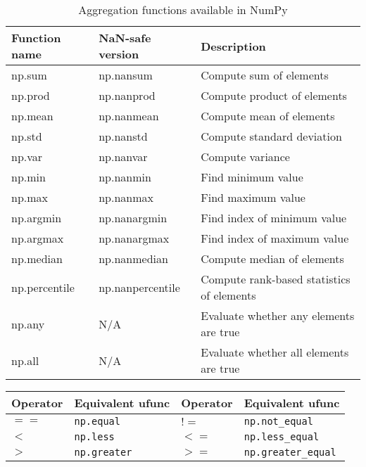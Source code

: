\begin{table}
    \centering
    \caption{Aggregation functions available in NumPy}
    \label{Aggregation functions available in NumPy}
    \begin{tabular}{lll}
        \hline
        Function name & NaN-safe version & Description                               \\
        \hline
        np.sum        & np.nansum        & Compute sum of elements                   \\
        np.prod       & np.nanprod       & Compute product of elements               \\
        np.mean       & np.nanmean       & Compute mean of elements                  \\
        np.std        & np.nanstd        & Compute standard deviation                \\
        np.var        & np.nanvar        & Compute variance                          \\
        np.min        & np.nanmin        & Find minimum value                        \\
        np.max        & np.nanmax        & Find maximum value                        \\
        np.argmin     & np.nanargmin     & Find index of minimum value               \\
        np.argmax     & np.nanargmax     & Find index of maximum value               \\
        np.median     & np.nanmedian     & Compute median of elements                \\
        np.percentile & np.nanpercentile & Compute rank-based statistics of elements \\
        np.any        & N/A              & Evaluate whether any elements are true    \\
        np.all        & N/A              & Evaluate whether all elements are true    \\
        \hline
    \end{tabular}
\end{table}

\begin{table}[H]
    \centering
    \begin{tabular}{llll}
        \hline
        Operator & Equivalent ufunc  & Operator & Equivalent ufunc        \\
        \hline
        $==$     & \verb|np.equal|   & $!=$     & \verb|np.not_equal|     \\
        $<$      & \verb|np.less|    & $<=$     & \verb|np.less_equal|    \\
        $>$      & \verb|np.greater| & $>=$     & \verb|np.greater_equal| \\
        \hline
    \end{tabular}
\end{table}

